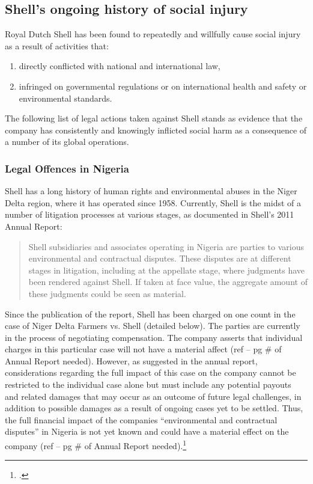 	\subsection{Shell's ongoing history of social injury}



Royal Dutch Shell has been found to repeatedly and willfully cause social injury as a result of activities that:
\begin{enumerate}
	\item directly conflicted with national and international law,
	\item infringed on governmental regulations or on international health and safety or environmental standards. 
\end{enumerate}
The following list of legal actions taken against Shell stands as evidence that the company has consistently and knowingly inflicted social harm as a consequence of a number of its global operations.



	\subsubsection{Legal Offences in Nigeria}



Shell has a long history of human rights and environmental abuses in the Niger Delta region, where it has operated since 1958.
Currently, Shell is the midst of a number of litigation processes at various stages, as documented in Shell’s 2011 Annual Report:
\begin{quote}
Shell subsidiaries and associates operating in Nigeria are parties to various environmental and contractual disputes.
These disputes are at different stages in litigation, including at the appellate stage, where judgments have been rendered against Shell. 
If taken at face value, the aggregate amount of these judgments could be seen as material.
\end{quote}
Since the publication of the report, Shell has been charged on one count in the case of Niger Delta Farmers vs. Shell (detailed below). 
The parties are currently in the process of negotiating compensation. 
The company asserts that individual charges in this particular case will not have a material affect (ref – pg \# of Annual Report needed). 
However, as suggested in the annual report, considerations regarding the full impact of this case on the company cannot be restricted to the individual case alone but must include any potential payouts and related damages that may occur as an outcome of future legal challenges, in addition to possible damages as a result of ongoing cases yet to be settled. 
Thus, the full financial impact of the companies ``environmental and contractual disputes'' in Nigeria is not yet known and could have a material effect on the company (ref – pg \# of Annual Report needed).\footcite[][p. 139]{Shell_2011}



